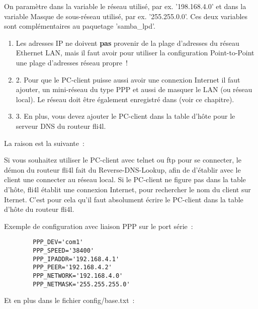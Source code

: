 \begin{description}
        On paramètre dans la variable  le réseau utilisé,
        par ex. '198.168.4.0' et dans la variable  Masque
        de sous-réseau utilisé, par ex. '255.255.0.0'. Ces deux variables sont
        complémentaires au paquetage 'samba\_lpd'.

    \begin{enumerate}
    \item  Les adresses IP ne doivent \textbf{pas} provenir de la plage
      d'adresses du réseau Ethernet LAN, mais il faut avoir pour utiliser
      la configuration Point-to-Point une plage d'adresses réseau propre~!


     \item  2.	Pour que le PC-client puisse aussi avoir une connexion Internet
       il faut ajouter, un mini-réseau du type PPP et aussi de masquer le LAN
       (ou réseau local). Le réseau doit être également enregistré dans
        (voir ce chapitre).


     \item  3.	En plus, vous devez ajouter le PC-client dans la table d'hôte
       pour le serveur DNS du routeur fli4l.
    \end{enumerate}

       La raison est la suivante~:

       Si vous souhaitez utiliser le PC-client avec telnet ou ftp pour se connecter,
       le démon du routeur fli4l fait du Reverse-DNS-Lookup, afin de d'établir
       avec le client une connecter au réseau local. Si le PC-client ne figure pas
       dans la table d'hôte, fli4l établit une connexion Internet, pour rechercher
       le nom du client sur Iternet. C'est pour cela qu'il faut absolument écrire
       le PC-client dans la table d'hôte du routeur fli4l.

       Exemple de configuration avec liaison PPP sur le port série~:

\begin{example}
\begin{verbatim}
        PPP_DEV='com1'
        PPP_SPEED='38400'
        PPP_IPADDR='192.168.4.1'
        PPP_PEER='192.168.4.2'
        PPP_NETWORK='192.168.4.0'
        PPP_NETMASK='255.255.255.0'
\end{verbatim}
\end{example}

           Et en plus dans le fichier config/base.txt~:


\end{description}
